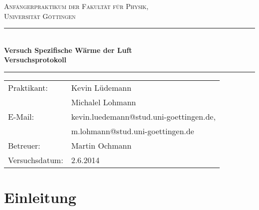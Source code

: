 \documentclass[12pt,a4paper,titlepage,headinclude,bibtotoc]{scrartcl}
\begin{document}
\begin{titlepage}
\centering
\textsc{\Large Anfängerpraktikum der Fakultät für
  Physik,\\[1.5ex] Universität Göttingen}

\vspace*{4.2cm}

\rule{\textwidth}{1pt}\\[0.5cm]
{\huge \bfseries
  Versuch Spezifische Wärme der Luft\\[1.5ex]
  Versuchsprotokoll}\\[0.5cm]
\rule{\textwidth}{1pt}

\vspace*{3cm}

\begin{Large}
\begin{tabular}{ll}
Praktikant: & Kevin Lüdemann  \\
	& Michalel Lohmann\\
E-Mail: & kevin.luedemann@stud.uni-goettingen.de, \\
	& m.lohmann@stud.uni-goettingen.de\\
Betreuer: & Martin Ochmann\\
Versuchsdatum: & 2.6.2014\\
\end{tabular}
\end{Large}

\vspace*{0.8cm}

\begin{Large}
\end{Large}

\end{titlepage}

\tableofcontents

\newpage

\section{Einleitung}
\label{sec:einleitung}
\end{document}
